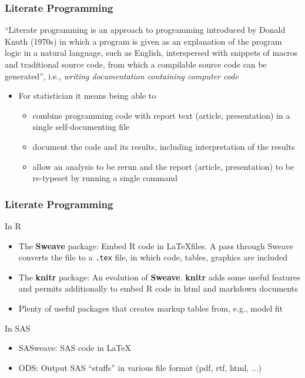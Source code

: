 \documentclass[paper=screen,mathserif]{beamer}\usepackage[]{graphicx}\usepackage[]{color}
\begin{document}
\begin{frame}
  \frametitle{Literate Programming} ``Literate programming is an
  approach to programming introduced by Donald Knuth (1970s) in which
  a program is given as an explanation of the program logic in a
  natural language, such as English, interspersed with snippets of
  macros and traditional source code, from which a compilable source
  code can be generated'', i.e., {\em writing documentation containing
    computer code}
  \vspace{0.3cm}\pause
  \begin{itemize}
  \item For statistician it means being able to
    \begin{itemize}
    \item combine programming code with report text (article,
      presentation) in a single self-documenting file
    \item document the code and its results, including interpretation
      of the results
    \item allow an analysis to be rerun and the report (article,
      presentation) to be re-typeset by running a single command
    \end{itemize}
   \end{itemize}
\end{frame}

\begin{frame}
  \frametitle{Literate Programming}
  In R
  \begin{itemize}
  \item The {\bf Sweave} package: Embed R code in \LaTeX files. A
    pass through Sweave converts the file to a {\tt .tex} file, in which
    code, tables, graphics are included 
  \item The {\bf knitr} package: An evolution of {\bf Sweave}. {\bf
      knitr} adds some useful features and permits additionally to
    embed R code in html and markdown documents
  \item Plenty of useful packages that creates markup tables from,
    e.g., model fit
  \end{itemize}
  In SAS
  \begin{itemize}
  \item SASweave: SAS code in \LaTeX
  \item ODS: Output SAS ``stuffs'' in various file format (pdf, rtf,
    html, ...)
  \end{itemize}
\end{frame}
\end{document}
